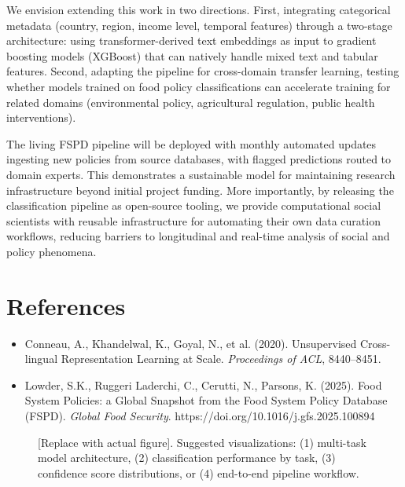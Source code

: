 \documentclass[a4paper,12pt]{article}
\begin{document}
We envision extending this work in two directions. First, integrating categorical metadata (country, region, income level, temporal features) through a two-stage architecture: using transformer-derived text embeddings as input to gradient boosting models (XGBoost) that can natively handle mixed text and tabular features. Second, adapting the pipeline for cross-domain transfer learning, testing whether models trained on food policy classifications can accelerate training for related domains (environmental policy, agricultural regulation, public health interventions).

The living FSPD pipeline will be deployed with monthly automated updates ingesting new policies from source databases, with flagged predictions routed to domain experts. This demonstrates a sustainable model for maintaining research infrastructure beyond initial project funding. More importantly, by releasing the classification pipeline as open-source tooling, we provide computational social scientists with reusable infrastructure for automating their own data curation workflows, reducing barriers to longitudinal and real-time analysis of social and policy phenomena.

\section*{References}

\small
\begin{itemize}
\itemsep0pt
\item Conneau, A., Khandelwal, K., Goyal, N., et al. (2020). Unsupervised Cross-lingual Representation Learning at Scale. \textit{Proceedings of ACL}, 8440--8451.
\item Lowder, S.K., Ruggeri Laderchi, C., Cerutti, N., Parsons, K. (2025). Food System Policies: a Global Snapshot from the Food System Policy Database (FSPD). \textit{Global Food Security}. https://doi.org/10.1016/j.gfs.2025.100894
\end{itemize}

\newpage

\begin{figure}[htp]
\centering
{}
\caption{[Replace with actual figure]. Suggested visualizations: (1) multi-task model architecture, (2) classification performance by task, (3) confidence score distributions, or (4) end-to-end pipeline workflow.}
\label{fig:placeholder}
\end{figure}
\end{document}
